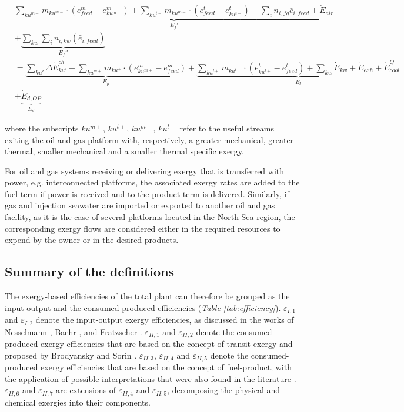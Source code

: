 \begin{align}
	&\underbrace{\sum_{ku^{m-}} \dot{m}_{ku^{m-}}\cdot(e_{feed}^{m}-e_{ku^{m-}}^{m})+\sum_{ku^{t-}} \dot{m}_{ku^{m-}}\cdot(e_{feed}^{t}-e_{ku^{t-}}^{t})+\sum_i \dot{n}_{i,fg}\bar{e}_{i,feed}+\dot{E}_{air}}_{E_f'}\nonumber\\
	&+\underbrace{\sum_{kw}\sum_i \dot{n}_{i,kw}(\bar{e}_{i,feed})}_{E_f''}\nonumber\\
	&=\underbrace{\sum_{ku'}\Delta{\dot{E}}^{ch}_{ku'}+\sum_{ku^{m+}}\dot{m}_{ku^{+}}\cdot(e_{ku^{m+}}^{m}-e_{feed}^{m})}_{E_p}+\underbrace{\sum_{ku^{t+}}\dot{m}_{ku^{t+}}\cdot(e_{ku^{t+}}^{t}-e_{feed}^{t})+\sum_{kw} \dot{E}_{kw}+\dot{E}_{exh}+\dot{E}^Q_{cool}}_{E_l} \nonumber\\
	&+\underbrace{\dot{E}_{d,OP}}_{E_d}
	\label{eq:speco_pressure}
\end{align}	

	where the subscripts $ku^{m+}$, $ku^{t+}$, $ku^{m-}$, $ku^{t-}$ refer to the useful streams exiting the oil and gas platform with, respectively, a greater mechanical, greater thermal, smaller mechanical and a smaller thermal specific exergy.

For oil and gas systems receiving or delivering exergy that is transferred with power, e.g. interconnected platforms, the associated exergy rates are added to the fuel term if power is received and to the product term is delivered. Similarly, if gas and injection seawater are imported or exported to another oil and gas facility, as it is the case of several platforms located in the North Sea region, the corresponding exergy flows are considered either in the required resources to expend by the owner or in the desired products.  

\subsection{Summary of the definitions}

The exergy-based efficiencies of the total plant can therefore be grouped as the input-output and the consumed-produced efficiencies (\emph{Table \ref{tab:efficiency}}). $\varepsilon_{I,1}$ and $\varepsilon_{I,2}$ denote the input-output exergy efficiencies, as discussed in the works of Nesselmann \cite{Nesselmann1953,Nesselmann1952}, Baehr \cite{Baehr1968}, and Fratzscher \cite{Fratzscher1986}. $\varepsilon_{II,1}$ and $\varepsilon_{II,2}$ denote the consumed-produced exergy efficiencies that are based on the concept of transit exergy and proposed by Brodyansky \cite{Brodyansky1994} and Sorin \cite{Sorin1994}. $\varepsilon_{II,3}$, $\varepsilon_{II,4}$ and $\varepsilon_{II,5}$ denote the consumed-produced exergy efficiencies that are based on the concept of fuel-product, with the application of possible interpretations that were also found in the literature \cite{Kotas1995,Oliveira1997,Voldsund2010,Voldsund2012,Lazzaretto1999,Lazzaretto2006,Cornelissen1997,Rian2012}. $\varepsilon_{II,6}$ and $\varepsilon_{II,7}$ are extensions of $\varepsilon_{II,4}$ and $\varepsilon_{II,5}$, decomposing the physical and chemical exergies into their components.

